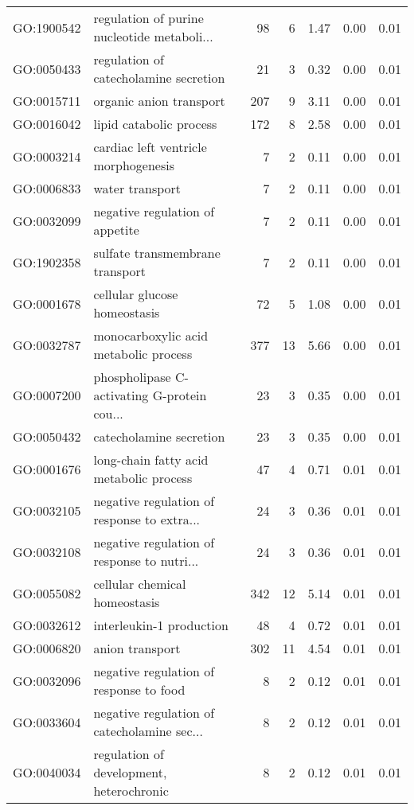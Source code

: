 \begin{table}[ht]
\begin{tabular}{llrrrrr}
  GO:1900542 & regulation of purine nucleotide metaboli... &  98 &   6 & 1.47 & 0.00 & 0.01 \\ 
  GO:0050433 & regulation of catecholamine secretion &  21 &   3 & 0.32 & 0.00 & 0.01 \\ 
  GO:0015711 & organic anion transport & 207 &   9 & 3.11 & 0.00 & 0.01 \\ 
  GO:0016042 & lipid catabolic process & 172 &   8 & 2.58 & 0.00 & 0.01 \\ 
  GO:0003214 & cardiac left ventricle morphogenesis &   7 &   2 & 0.11 & 0.00 & 0.01 \\ 
  GO:0006833 & water transport &   7 &   2 & 0.11 & 0.00 & 0.01 \\ 
  GO:0032099 & negative regulation of appetite &   7 &   2 & 0.11 & 0.00 & 0.01 \\ 
  GO:1902358 & sulfate transmembrane transport &   7 &   2 & 0.11 & 0.00 & 0.01 \\ 
  GO:0001678 & cellular glucose homeostasis &  72 &   5 & 1.08 & 0.00 & 0.01 \\ 
  GO:0032787 & monocarboxylic acid metabolic process & 377 &  13 & 5.66 & 0.00 & 0.01 \\ 
  GO:0007200 & phospholipase C-activating G-protein cou... &  23 &   3 & 0.35 & 0.00 & 0.01 \\ 
  GO:0050432 & catecholamine secretion &  23 &   3 & 0.35 & 0.00 & 0.01 \\ 
  GO:0001676 & long-chain fatty acid metabolic process &  47 &   4 & 0.71 & 0.01 & 0.01 \\ 
  GO:0032105 & negative regulation of response to extra... &  24 &   3 & 0.36 & 0.01 & 0.01 \\ 
  GO:0032108 & negative regulation of response to nutri... &  24 &   3 & 0.36 & 0.01 & 0.01 \\ 
  GO:0055082 & cellular chemical homeostasis & 342 &  12 & 5.14 & 0.01 & 0.01 \\ 
  GO:0032612 & interleukin-1 production &  48 &   4 & 0.72 & 0.01 & 0.01 \\ 
  GO:0006820 & anion transport & 302 &  11 & 4.54 & 0.01 & 0.01 \\ 
  GO:0032096 & negative regulation of response to food &   8 &   2 & 0.12 & 0.01 & 0.01 \\ 
  GO:0033604 & negative regulation of catecholamine sec... &   8 &   2 & 0.12 & 0.01 & 0.01 \\ 
  GO:0040034 & regulation of development, heterochronic &   8 &   2 & 0.12 & 0.01 & 0.01 \\ 

\end{tabular}
\end{table}
